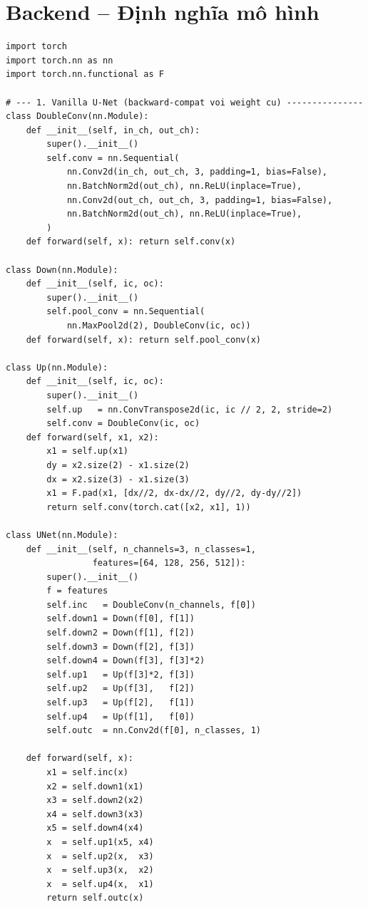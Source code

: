 \section{Backend -- Định nghĩa mô hình}

\begin{lstlisting}[style=codePython, caption={Vanilla UNet va SMP wrapper -- ho tro U-Net va U-Net++ (app/models/unet.py)}]
import torch
import torch.nn as nn
import torch.nn.functional as F

# --- 1. Vanilla U-Net (backward-compat voi weight cu) ---------------
class DoubleConv(nn.Module):
    def __init__(self, in_ch, out_ch):
        super().__init__()
        self.conv = nn.Sequential(
            nn.Conv2d(in_ch, out_ch, 3, padding=1, bias=False),
            nn.BatchNorm2d(out_ch), nn.ReLU(inplace=True),
            nn.Conv2d(out_ch, out_ch, 3, padding=1, bias=False),
            nn.BatchNorm2d(out_ch), nn.ReLU(inplace=True),
        )
    def forward(self, x): return self.conv(x)

class Down(nn.Module):
    def __init__(self, ic, oc):
        super().__init__()
        self.pool_conv = nn.Sequential(
            nn.MaxPool2d(2), DoubleConv(ic, oc))
    def forward(self, x): return self.pool_conv(x)

class Up(nn.Module):
    def __init__(self, ic, oc):
        super().__init__()
        self.up   = nn.ConvTranspose2d(ic, ic // 2, 2, stride=2)
        self.conv = DoubleConv(ic, oc)
    def forward(self, x1, x2):
        x1 = self.up(x1)
        dy = x2.size(2) - x1.size(2)
        dx = x2.size(3) - x1.size(3)
        x1 = F.pad(x1, [dx//2, dx-dx//2, dy//2, dy-dy//2])
        return self.conv(torch.cat([x2, x1], 1))

class UNet(nn.Module):
    def __init__(self, n_channels=3, n_classes=1,
                 features=[64, 128, 256, 512]):
        super().__init__()
        f = features
        self.inc   = DoubleConv(n_channels, f[0])
        self.down1 = Down(f[0], f[1])
        self.down2 = Down(f[1], f[2])
        self.down3 = Down(f[2], f[3])
        self.down4 = Down(f[3], f[3]*2)
        self.up1   = Up(f[3]*2, f[3])
        self.up2   = Up(f[3],   f[2])
        self.up3   = Up(f[2],   f[1])
        self.up4   = Up(f[1],   f[0])
        self.outc  = nn.Conv2d(f[0], n_classes, 1)

    def forward(self, x):
        x1 = self.inc(x)
        x2 = self.down1(x1)
        x3 = self.down2(x2)
        x4 = self.down3(x3)
        x5 = self.down4(x4)
        x  = self.up1(x5, x4)
        x  = self.up2(x,  x3)
        x  = self.up3(x,  x2)
        x  = self.up4(x,  x1)
        return self.outc(x)


\end{lstlisting}
